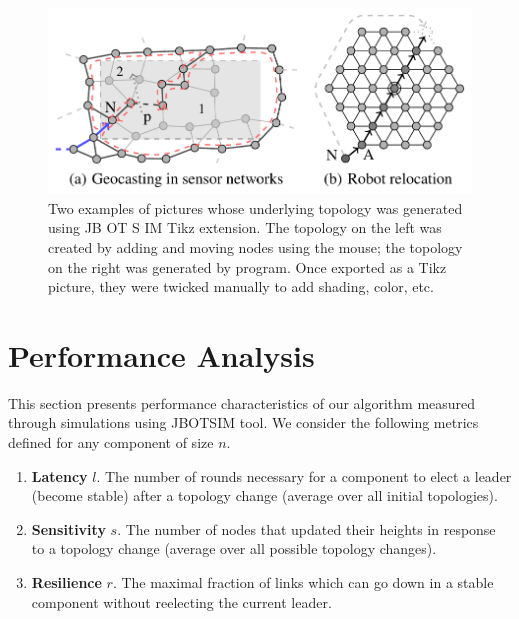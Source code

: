 \begin{figure}[h]
	\centering
	\includegraphics[width=0.7\linewidth]{fig_7}
	\caption[Two examples of pictures whose underlying topology was generated using JB OT S IM Tikz extension. The topology on the left was created by adding and moving nodes using the mouse; the topology on the right was generated by program. Once exported as a Tikz picture, they were twicked manually to add shading, color, etc.]{Two examples of pictures whose underlying topology was generated using JB OT S IM Tikz extension. The topology on the left was created by adding and moving nodes using the mouse; the topology on the right was generated by program. Once exported as a Tikz picture, they were twicked manually to add shading, color, etc.}
	\label{fig:fig7}
\end{figure}


\section{Performance Analysis}

This section presents performance characteristics of our algorithm measured through simulations using JBOTSIM\cite{26} tool. We consider the following metrics defined for any component of size $n$.

\begin{enumerate}
	\item \textbf{Latency} $l$. The number of rounds necessary for a component to elect a leader (become stable) after a topology change (average over all initial topologies).
	
	\item \textbf{Sensitivity} $s$. The number of nodes that updated their heights in response to a topology change (average over all possible topology changes).
	
	\item \textbf{Resilience} $r$. The maximal fraction of links which can go down in a stable component without reelecting the current leader.
	
\end{enumerate}

